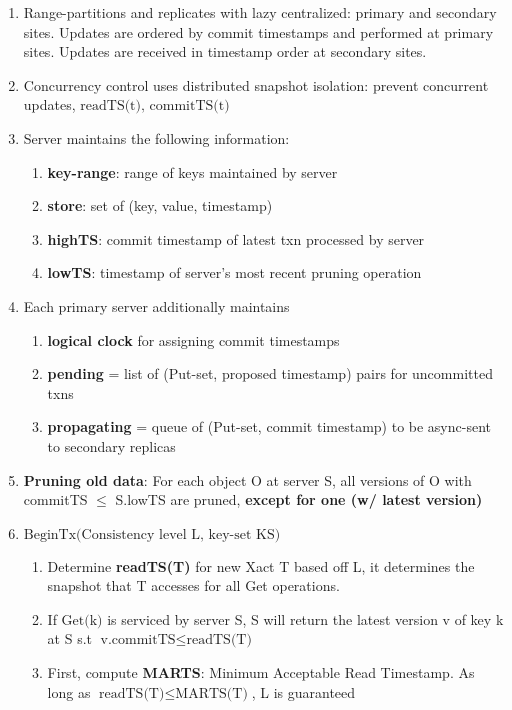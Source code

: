 \documentclass[8pt, landscape]{extarticle}
\begin{document}
\begin{multicols*}{4}
\begin{enumerate}
    \item Range-partitions and replicates with lazy centralized: primary and secondary sites. Updates are ordered by commit timestamps and performed at primary sites. Updates are received in timestamp order at secondary sites.
    \item Concurrency control uses distributed snapshot isolation: prevent concurrent updates, $\text{readTS(t), commitTS(t)}$
    \item Server maintains the following information:
    \begin{enumerate}
        \item \textbf{key-range}: range of keys maintained by server
        \item \textbf{store}: set of (key, value, timestamp)
        \item \textbf{highTS}: commit timestamp of latest txn processed by server
        \item \textbf{lowTS}: timestamp of server's most recent pruning operation
    \end{enumerate}
    \item Each primary server additionally maintains
    \begin{enumerate}
        \item \textbf{logical clock} for assigning commit timestamps
        \item \textbf{pending} = list of (Put-set, proposed timestamp) pairs for uncommitted txns
        \item \textbf{propagating} = queue of (Put-set, commit timestamp) to be async-sent to secondary replicas
    \end{enumerate}
    \item \textbf{Pruning old data}: For each object O at server S, all versions of O with commitTS $\leq$ S.lowTS are pruned, \textbf{except for one (w/ latest version)}
    \item $\text{BeginTx(Consistency level L, key-set KS)}$
    \begin{enumerate}
        \item Determine \textbf{readTS(T)} for new Xact T based off L, it determines the snapshot that T accesses for all Get operations.
        \item If $\text{Get(k)}$ is serviced by server S, S will return the latest version v of key k at S s.t $\text{v.commitTS} \leq \text{readTS(T)}$
        \item First, compute \textbf{MARTS}: Minimum Acceptable Read Timestamp. As long as $\text{readTS(T)} \leq \text{MARTS(T)}$, L is guaranteed

\end{enumerate}
\end{enumerate}
\end{multicols*}
\end{document}
